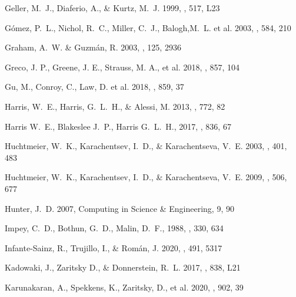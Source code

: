 \documentclass[twocolumn,tighten]{aastex63}
\begin{document}
\begin{thebibliography}{}
Geller, M.~J., Diaferio, A., \& Kurtz, M.~J. 1999, \aj, 517, L23


G\'{o}mez, P.~L., Nichol, R.~C., Miller, C.~J., Balogh,M.~L. et al. 2003, \apj, 584, 210

Graham, A.~W. \& Guzm\'{a}n, R. 2003, \aj, 125, 2936


Greco, J. P., Greene, J. E., Strauss, M. A., et al. 2018, \apj, 857, 104

Gu, M., Conroy, C., Law, D. et al. 2018, \apj, 859, 37

Harris, W.~E., Harris, G.~L.~H., \& Alessi, M. 2013, \apj, 772, 82

Harris W.~E., Blakeslee J.~P., Harris G.~L.~H., 2017, \apj, 836, 67


Huchtmeier, W.~K., Karachentsev, I.~D., \& Karachentseva, V.~E. 2003, \aap, 401, 483

Huchtmeier, W.~K., Karachentsev, I.~D., \& Karachentseva, V.~E. 2009, \aap, 506, 677

Hunter, J.~D. 2007, Computing in Science \& Engineering, 9, 90

Impey, C.~D., Bothun, G.~D., Malin, D.~F., 1988, \apj, 330, 634

Infante-Sainz, R., Trujillo, I., \& Rom\'an, J. 2020, \mnras, 491, 5317
 

Kadowaki, J., Zaritsky D., \& Donnerstein, R.~L. 2017, \apjl, 838, L21

Karunakaran, A., Spekkens, K., Zaritsky, D., et al. 2020, \apj, 902, 39


\end{thebibliography}
\end{document}

